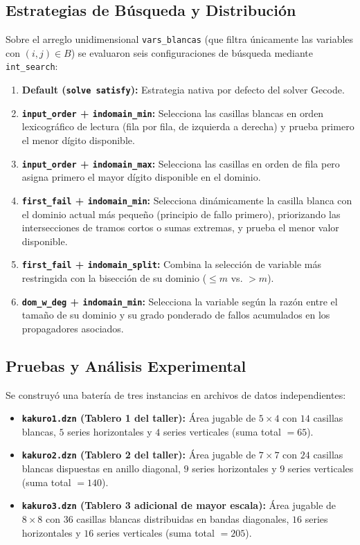 \subsection{Estrategias de Búsqueda y Distribución}
Sobre el arreglo unidimensional \texttt{vars\_blancas} (que filtra únicamente las variables con $(i, j) \in B$) se evaluaron seis configuraciones de búsqueda mediante \texttt{int\_search}:
\begin{enumerate}
    \item \textbf{Default (\texttt{solve satisfy}):} Estrategia nativa por defecto del solver Gecode.
    \item \textbf{\texttt{input\_order} + \texttt{indomain\_min}:} Selecciona las casillas blancas en orden lexicográfico de lectura (fila por fila, de izquierda a derecha) y prueba primero el menor dígito disponible.
    \item \textbf{\texttt{input\_order} + \texttt{indomain\_max}:} Selecciona las casillas en orden de fila pero asigna primero el mayor dígito disponible en el dominio.
    \item \textbf{\texttt{first\_fail} + \texttt{indomain\_min}:} Selecciona dinámicamente la casilla blanca con el dominio actual más pequeño (principio de fallo primero), priorizando las intersecciones de tramos cortos o sumas extremas, y prueba el menor valor disponible.
    \item \textbf{\texttt{first\_fail} + \texttt{indomain\_split}:} Combina la selección de variable más restringida con la bisección de su dominio ($\le m$ vs. $> m$).
    \item \textbf{\texttt{dom\_w\_deg} + \texttt{indomain\_min}:} Selecciona la variable según la razón entre el tamaño de su dominio y su grado ponderado de fallos acumulados en los propagadores asociados.
\end{enumerate}

\subsection{Pruebas y Análisis Experimental}
Se construyó una batería de tres instancias en archivos de datos independientes:
\begin{itemize}
    \item \textbf{\texttt{kakuro1.dzn} (Tablero 1 del taller):} Área jugable de $5 \times 4$ con $14$ casillas blancas, $5$ series horizontales y $4$ series verticales (suma total $= 65$).
    \item \textbf{\texttt{kakuro2.dzn} (Tablero 2 del taller):} Área jugable de $7 \times 7$ con $24$ casillas blancas dispuestas en anillo diagonal, $9$ series horizontales y $9$ series verticales (suma total $= 140$).
    \item \textbf{\texttt{kakuro3.dzn} (Tablero 3 adicional de mayor escala):} Área jugable de $8 \times 8$ con $36$ casillas blancas distribuidas en bandas diagonales, $16$ series horizontales y $16$ series verticales (suma total $= 205$).
\end{itemize}

